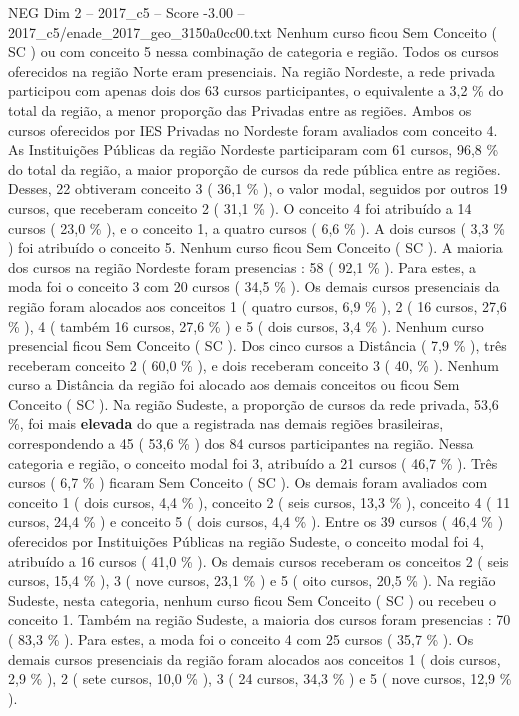 \begin{textsample}{NEG Dim 2 – 2017\_c5 – Score -3.00 – 2017\_c5/enade\_2017\_geo\_3150a0cc00.txt}
Nenhum curso ficou Sem Conceito ( SC ) ou com conceito 5 nessa combinação de categoria e região.
Todos os cursos oferecidos na região Norte eram presenciais.
Na região Nordeste, a rede privada participou com apenas dois dos 63 cursos participantes, o equivalente a 3,2 \% do total da região, a menor proporção das Privadas entre as regiões.
Ambos os cursos oferecidos por IES Privadas no Nordeste foram avaliados com conceito 4.
As Instituições Públicas da região Nordeste participaram com 61 cursos, 96,8 \% do total da região, a maior proporção de cursos da rede pública entre as regiões.
Desses, 22 obtiveram conceito 3 ( 36,1 \% ), o valor modal, seguidos por outros 19 cursos, que receberam conceito 2 ( 31,1 \% ).
O conceito 4 foi atribuído a 14 cursos ( 23,0 \% ), e o conceito 1, a quatro cursos ( 6,6 \% ).
A dois cursos ( 3,3 \% ) foi atribuído o conceito 5.
Nenhum curso ficou Sem Conceito ( SC ).
A maioria dos cursos na região Nordeste foram presencias : 58 ( 92,1 \% ).
Para estes, a moda foi o conceito 3 com 20 cursos ( 34,5 \% ).
Os demais cursos presenciais da região foram alocados aos conceitos 1 ( quatro cursos, 6,9 \% ), 2 ( 16 cursos, 27,6 \% ), 4 ( também 16 cursos, 27,6 \% ) e 5 ( dois cursos, 3,4 \% ).
Nenhum curso presencial ficou Sem Conceito ( SC ).
Dos cinco cursos a Distância ( 7,9 \% ), três receberam conceito 2 ( 60,0 \% ), e dois receberam conceito 3 ( 40, \% ).
Nenhum curso a Distância da região foi alocado aos demais conceitos ou ficou Sem Conceito ( SC ).
Na região Sudeste, a proporção de cursos da rede privada, 53,6 \%, foi mais \textbf{elevada} do que a registrada nas demais regiões brasileiras, correspondendo a 45 ( 53,6 \% ) dos 84 cursos participantes na região.
Nessa categoria e região, o conceito modal foi 3, atribuído a 21 cursos ( 46,7 \% ).
Três cursos ( 6,7 \% ) ficaram Sem Conceito ( SC ).
Os demais foram avaliados com conceito 1 ( dois cursos, 4,4 \% ), conceito 2 ( seis cursos, 13,3 \% ), conceito 4 ( 11 cursos, 24,4 \% ) e conceito 5 ( dois cursos, 4,4 \% ).
Entre os 39 cursos ( 46,4 \% ) oferecidos por Instituições Públicas na região Sudeste, o conceito modal foi 4, atribuído a 16 cursos ( 41,0 \% ).
Os demais cursos receberam os conceitos 2 ( seis cursos, 15,4 \% ), 3 ( nove cursos, 23,1 \% ) e 5 ( oito cursos, 20,5 \% ).
Na região Sudeste, nesta categoria, nenhum curso ficou Sem Conceito ( SC ) ou recebeu o conceito 1.
Também na região Sudeste, a maioria dos cursos foram presencias : 70 ( 83,3 \% ).
Para estes, a moda foi o conceito 4 com 25 cursos ( 35,7 \% ).
Os demais cursos presenciais da região foram alocados aos conceitos 1 ( dois cursos, 2,9 \% ), 2 ( sete cursos, 10,0 \% ), 3 ( 24 cursos, 34,3 \% ) e 5 ( nove cursos, 12,9 \% ).

\end{textsample}
